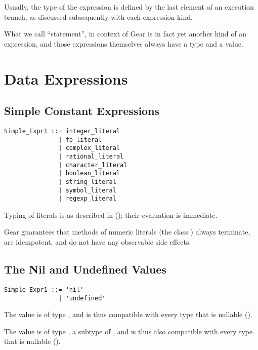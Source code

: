 Usually, the type of the expression is defined by the last element of an execution branch, as discussed subsequently with each expression kind. 

What we call ``statement'', in context of Gear is in fact yet another kind of an expression, and those expressions themselves always have a type and a value. 





\section{Data Expressions}





\subsection{Simple Constant Expressions}
\label{sec:literal-expr}

\syntax\begin{lstlisting}
Simple_Expr1 ::= integer_literal
               | fp_literal
               | complex_literal
               | rational_literal
               | character_literal
               | boolean_literal
               | string_literal
               | symbol_literal
               | regexp_literal
\end{lstlisting}

Typing of literals is as described in (); their evaluation is immediate. 

Gear guarantees that methods of numeric literals (the class ) always terminate, are idempotent, and do not have any observable side effects. 







\subsection{The Nil and Undefined Values}

\syntax\begin{lstlisting}
Simple_Expr1 ::= 'nil'
               | 'undefined'
\end{lstlisting}

The  value is of type , and is thus compatible with every type that is nullable ().

The  value is of type , a subtype of , and is thus also compatible with every type that is nullable (). 

